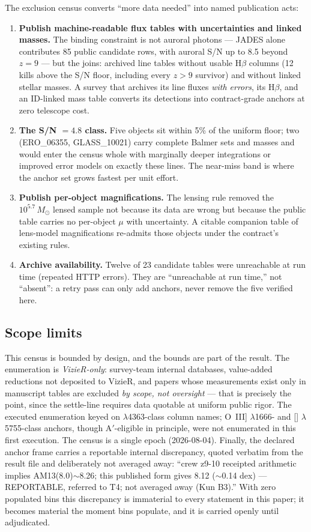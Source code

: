 \documentclass[twocolumn]{aastex702}
\begin{document}
The exclusion census converts ``more data needed'' into named publication acts:

\begin{enumerate}
\item \textbf{Publish machine-readable flux tables with uncertainties and linked
masses.} The binding constraint is not auroral photons --- JADES alone contributes
85 public candidate rows, with auroral S/N up to 8.5 beyond $z=9$ --- but the
joins: archived line tables without usable H$\beta$ columns (12 kills above the
S/N floor, including every $z>9$ survivor) and without linked stellar masses.
A survey that archives its line fluxes \emph{with errors}, its H$\beta$, and an
ID-linked mass table converts its detections into contract-grade anchors at zero
telescope cost.
\item \textbf{The S/N $=4.8$ class.} Five objects sit within 5\% of the uniform
floor; two (ERO\_06355, GLASS\_10021) carry complete Balmer sets and masses and
would enter the census whole with marginally deeper integrations or improved
error models on exactly these lines. The near-miss band is where the anchor set
grows fastest per unit effort.
\item \textbf{Publish per-object magnifications.} The lensing rule removed the
$10^{5.7}\,M_\odot$ lensed sample not because its data are wrong but because the
public table carries no per-object $\mu$ with uncertainty. A citable companion
table of lens-model magnifications re-admits those objects under the contract's
existing rules.
\item \textbf{Archive availability.} Twelve of 23 candidate tables were
unreachable at run time (repeated HTTP errors). They are ``unreachable at run
time,'' not ``absent'': a retry pass can only add anchors, never remove the five
verified here.
\end{enumerate}

\subsection{Scope limits}\label{sec:scope}

This census is bounded by design, and the bounds are part of the result. The
enumeration is \emph{VizieR-only}: survey-team internal databases, value-added
reductions not deposited to VizieR, and papers whose measurements exist only in
manuscript tables are excluded \emph{by scope, not oversight} --- that is
precisely the point, since the settle-line requires data quotable at uniform
public rigor. The executed enumeration keyed on $\lambda$4363-class column names;
O~III] $\lambda$1666- and [] $\lambda$5755-class anchors, though
A$'$-eligible in principle, were not enumerated in this first execution. The
census is a single epoch (2026-08-04). Finally, the declared anchor frame carries
a reportable internal discrepancy, quoted verbatim from the result file and
deliberately not averaged away: ``crew z9-10 receipted arithmetic implies
AM13(8.0)$\sim$8.26; this published form gives 8.12 ($\sim$0.14 dex) ---
REPORTABLE, referred to T4; not averaged away (Kun B3).'' With zero populated
bins this discrepancy is immaterial to every statement in this paper; it becomes
material the moment bins populate, and it is carried openly until adjudicated.
\end{document}
